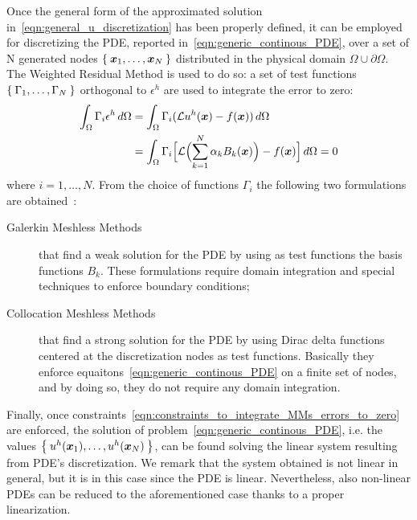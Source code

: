 Once the general form of the approximated solution in~\eqref{eqn:general_u_discretization} has been properly defined, it can be employed for discretizing the PDE, reported in~\eqref{eqn:generic_continous_PDE}, over a set of N generated nodes $\Set{\boldsymbol{x}_1, \dots, \boldsymbol{x}_N}$ distributed in the physical domain $\Omega \cup \partial\Omega$.
The Weighted Residual Method is used to do so: a set of test functions $\Set{\Gamma_1, \dots, \Gamma_N}$ orthogonal to $\epsilon^{h}$ are used to integrate the error to zero:
\begin{equation}
\label{eqn:constraints_to_integrate_MMs_errors_to_zero}
	\begin{split}
		\int_{\Omega} \Gamma_i \epsilon^{h}\,d\Omega & = \int_{\Omega} \Gamma_i (\mathcal{L} u^{h}(\vec{x}) - f(\vec{x}))\,d\Omega  \\
		& = \int_{\Omega} \Gamma_i \Bigl[ \mathcal{L}\Bigl( \sum_{k= 1}^{N} {\alpha_k B_k(\vec{x})}\Bigr) - f(\vec{x})\Bigr]\,d\Omega = 0
	\end{split}
\end{equation}
where $i=1, \dots, N$. From the choice of functions $\Gamma_i$ the following two formulations are obtained~\cite{Chen:meshless_overview_after_20_years}:
\begin{description}
	\item[Galerkin Meshless Methods] that find a weak solution for the PDE by using as test functions the basis functions $B_k$. These formulations require domain integration and special techniques to enforce boundary conditions;
	\item[Collocation Meshless Methods] that find a strong solution for the PDE by using Dirac delta functions centered at the discretization nodes as test functions. Basically they enforce equaitons~\eqref{eqn:generic_continous_PDE} on a finite set of nodes, and by doing so, they do not require any domain integration.
\end{description}

Finally, once constraints~\eqref{eqn:constraints_to_integrate_MMs_errors_to_zero} are enforced, the solution of problem~\eqref{eqn:generic_continous_PDE}, i.e. the values $\Set{u^h(\boldsymbol{x}_1), \dots, u^h(\boldsymbol{x}_N)}$, can be found solving the linear system  resulting from PDE's discretization. We remark that the system obtained is not linear in general, but it is in this case since the PDE is linear. Nevertheless, also non-linear PDEs can be reduced to the aforementioned case thanks to a proper linearization.

